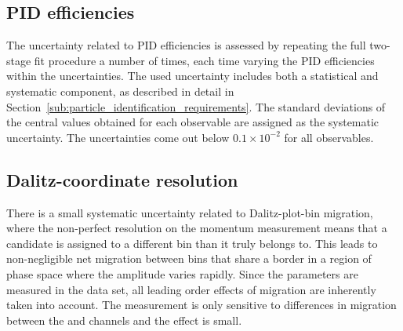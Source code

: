 \subsection{PID efficiencies} %
\label{sub:pid_efficiency_systematic}
The uncertainty related to PID efficiencies is assessed by repeating the full two-stage fit procedure a number of times, each time varying the PID efficiencies within the uncertainties. The used uncertainty includes both a statistical and systematic component, as described in detail in Section~\ref{sub:particle_identification_requirements}. The standard deviations of the central values obtained for each observable are assigned as the systematic uncertainty. The uncertainties come out below $0.1\times 10^{-2}$ for all observables.

\subsection{Dalitz-coordinate resolution} %
\label{sub:dalitz_plot_bin_migration}

There is a small systematic uncertainty related to Dalitz-plot-bin migration, where the non-perfect resolution on the momentum measurement means that a candidate is assigned to a different bin than it truly belongs to. This leads to non-negligible net migration between bins that share a border in a region of phase space where the amplitude varies rapidly. Since the \Fi parameters are measured in the data set, all leading order effects of migration are inherently taken into account. The measurement is only sensitive to differences in migration between the \DK and \Dpi channels and the effect is small. 

